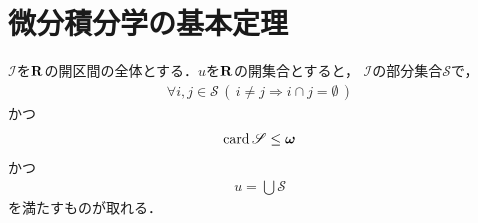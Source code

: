 \section{微分積分学の基本定理}
	
	\begin{screen}
		\begin{thm}[$\R$の開集合は交わらない開区間の高々可算和で書ける]
		\label{thm:any_open_subset_of_R_is_at_most_countable_union_of_disjoint_open_intervals}
			$\mathscr{I}$を$\R$の開区間の全体とする．$u$を$\R$の開集合とすると，
			$\mathscr{I}$の部分集合$\mathscr{S}$で，
			\begin{align}
				\forall i,j \in \mathscr{S}\, \left(\, i \neq j \Longrightarrow i \cap j = \emptyset\, \right)
			\end{align}
			かつ
			\begin{align}
				\operatorname{card} \mathscr{S} \leq {\boldsymbol \omega}
			\end{align}
			かつ
			\begin{align}
				u = \bigcup \mathscr{S}
			\end{align}
			を満たすものが取れる．
		\end{thm}
	\end{screen}
	

